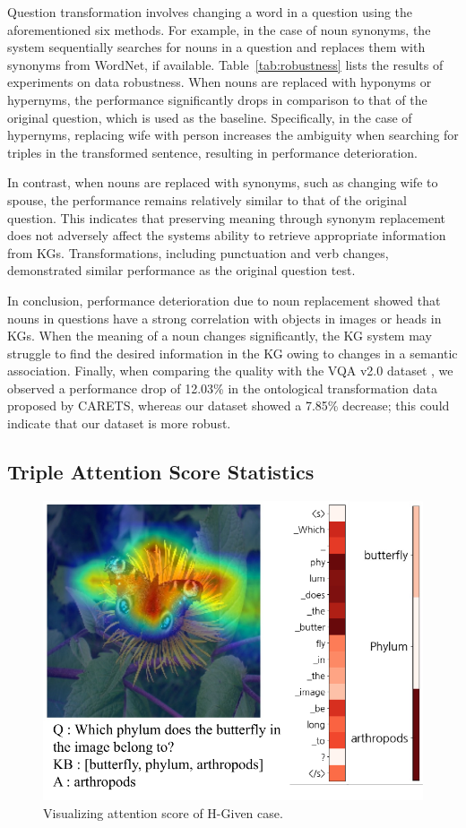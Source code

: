 \documentclass[letterpaper]{article} %
\begin{document}
Question transformation involves changing a word in a question using the aforementioned six methods. For example, in the case of noun synonyms, the system sequentially searches for nouns in a question and replaces them with synonyms from WordNet, if available. Table~\ref{tab:robustness} lists the results of experiments on data robustness. When nouns are replaced with hyponyms or hypernyms, the performance significantly drops in comparison to that of the original question, which is used as the baseline. Specifically, in the case of hypernyms, replacing wife with person increases the ambiguity when searching for triples in the transformed sentence, resulting in performance deterioration.

In contrast, when nouns are replaced with synonyms, such as changing wife to spouse, the performance remains relatively similar to that of the original question. This indicates that preserving meaning through synonym replacement does not adversely affect the systems ability to retrieve appropriate information from KGs. Transformations, including punctuation and verb changes, demonstrated similar performance as the original question test.

In conclusion, performance deterioration due to noun replacement showed that nouns in questions have a strong correlation with objects in images or heads in KGs. When the meaning of a noun changes significantly, the KG system may struggle to find the desired information in the KG owing to changes in a semantic association. Finally, when comparing the quality with the VQA v2.0 dataset \cite{balanced_vqa_v2}, we observed a performance drop of 12.03\% in the ontological transformation data proposed by CARETS, whereas our dataset showed a 7.85\% decrease; this could indicate that our dataset is more robust.


\subsection{Triple Attention Score Statistics}

\begin{figure}[h]
\includegraphics[width=\linewidth]{analysis_images/analysis_fig.pdf}
\caption{Visualizing attention score of H-Given case.}
\label{fig:fig5}
\end{figure}
\end{document}

